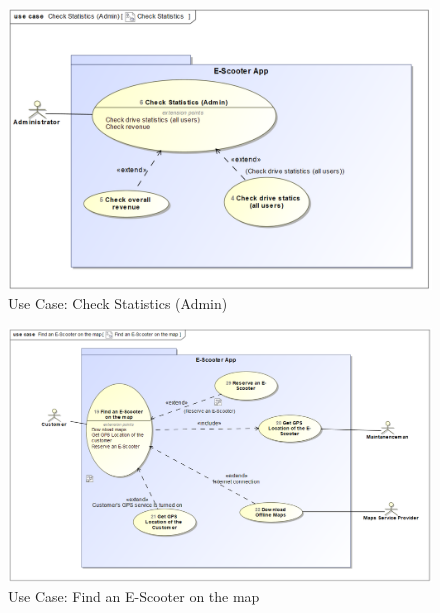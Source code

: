\documentclass[a4paper, 12pt]{article}
\begin{document}
\begin{figure} [htbp]
  \begin{center}
    \includegraphics[scale=0.7]{images/UseCases/CheckStatistics(Admin).png}
  \end{center}
  \caption{Use Case: Check Statistics (Admin)}
\end{figure}

\begin{figure} [htbp]
  \begin{center}
    \includegraphics[scale=0.6]{images/UseCases/FindE-ScooterOnTheMap.png}
  \end{center}
  \caption{Use Case: Find an E-Scooter on the map}
\end{figure}
\end{document}

